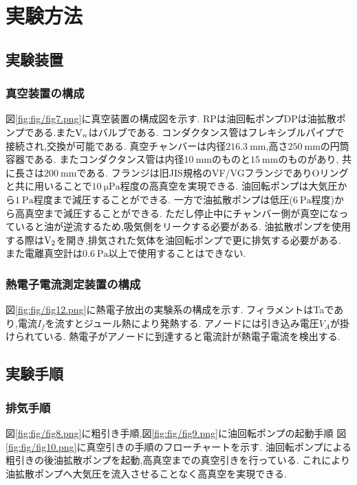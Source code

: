 \section{実験方法}
\subsection{実験装置}
\subsubsection{真空装置の構成}
図\ref{fig:fig/fig7.png}に真空装置の構成図を示す.
RPは油回転ポンプDPは油拡散ポンプである.また${\rm V}_n$はバルブである.
コンダクタンス管はフレキシブルパイプで接続され,交換が可能である.
真空チャンバーは内径$216.3\ \si{\milli\metre}$,高さ$250\ \si{\milli\metre}$の円筒容器である.
またコンダクタンス管は内径$10\ \si{\milli\metre}$のものと$15\ \si{\milli\metre}$のものがあり,
共に長さは$200\ \si{\milli\metre}$である.
フランジは旧JIS規格のVF/VGフランジでありOリングと共に用いることで$10\ \si{\micro\pascal}$程度の高真空を実現できる.\cite{VacuumTe71:online}
油回転ポンプは大気圧から$1\ \si{\pascal}$程度まで減圧することができる.
一方で油拡散ポンプは低圧($6\ \si{\pascal}$程度)から高真空まで減圧することができる.
ただし停止中にチャンバー側が真空になっていると油が逆流するため,吸気側をリークする必要がある.
油拡散ポンプを使用する際は${\rm V}_2$を開き,排気された気体を油回転ポンプで更に排気する必要がある.
また電離真空計は$0.6\ \si{\pascal}$以上で使用することはできない.
\subsubsection{熱電子電流測定装置の構成}
図\ref{fig:fig/fig12.png}に熱電子放出の実験系の構成を示す.
フィラメントはTaであり,電流$I_f$を流すとジュール熱により発熱する.
アノードには引き込み電圧$V_A$が掛けられている.
熱電子がアノードに到達すると電流計が熱電子電流を検出する.
\subsection{実験手順}
\subsubsection{排気手順}
図\ref{fig:fig/fig8.png}に粗引き手順,図\ref{fig:fig/fig9.png}に油回転ポンプの起動手順
図\ref{fig:fig/fig10.png}に真空引きの手順のフローチャートを示す.
油回転ポンプによる粗引きの後油拡散ポンプを起動,高真空までの真空引きを行っている.
これにより油拡散ポンプへ大気圧を流入させることなく高真空を実現できる.
\begin{figure}[htbp]
  \begin{minipage}{0.5\hsize}
    \centering
  \end{minipage}
  \begin{minipage}{0.5\hsize}
    \centering
  \end{minipage}
\end{figure}
\newpage
